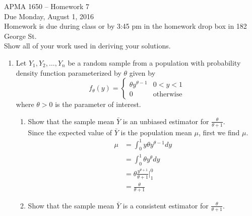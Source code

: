 \documentclass[12pt]{article}
\begin{document}
\title{}
\author{\vspace{-10ex} }

\begin{center}
{\LARGE APMA 1650 -- Homework 7}\\
\vspace{5mm}
{\large Due Monday, August 1, 2016}\\
\vspace{5mm}
Homework is due during class or by 3:45 pm in the homework drop box in 182 George St.\\
Show all of your work used in deriving your solutions.
\end{center}

\begin{enumerate}

\item Let $Y_1, Y_2, \dots, Y_n$ be a random sample from a population with probability density function parameterized by $\theta$ given by
\[
f_\theta(y) = \begin{cases}
\theta y^{\theta - 1} & 0 < y < 1 \\
0 & \text{otherwise}
\end{cases}
\]
where $\theta > 0$ is the parameter of interest. 
\begin{enumerate}
\item Show that the sample mean $\bar{Y}$ is an unbiased estimator for $\frac{\theta}{\theta + 1}$.\\

Since the expected value of $\bar{Y}$ is the population mean $\mu$, first we find $\mu$.
\begin{align*}
\mu &= \int_0^1 y \theta y^{\theta - 1} dy \\
&= \int_0^1 \theta y^{\theta} dy \\
&= \theta \frac{y^{\theta + 1}}{\theta + 1}\Bigr|^0_1 \\
&= \frac{\theta}{\theta + 1}
\end{align*}

\item Show that the sample mean $\bar{Y}$ is a consistent estimator for $\frac{\theta}{\theta + 1}$.\\


\end{enumerate}
\end{enumerate}
\end{document}
